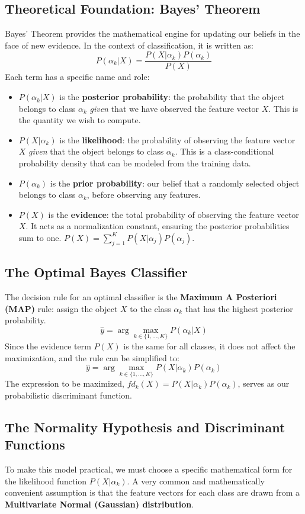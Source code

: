 \subsection*{Theoretical Foundation: Bayes' Theorem}
Bayes' Theorem provides the mathematical engine for updating our beliefs in the face of new evidence. In the context of classification, it is written as:
$$ P(\alpha_k | X) = \frac{P(X | \alpha_k) P(\alpha_k)}{P(X)} $$
Each term has a specific name and role:
\begin{itemize}
    \item \textbf{$P(\alpha_k | X)$} is the \textbf{posterior probability}: the probability that the object belongs to class $\alpha_k$ \textit{given} that we have observed the feature vector $X$. This is the quantity we wish to compute.
    \item \textbf{$P(X | \alpha_k)$} is the \textbf{likelihood}: the probability of observing the feature vector $X$ \textit{given} that the object belongs to class $\alpha_k$. This is a class-conditional probability density that can be modeled from the training data.
    \item \textbf{$P(\alpha_k)$} is the \textbf{prior probability}: our belief that a randomly selected object belongs to class $\alpha_k$, before observing any features.
    \item \textbf{$P(X)$} is the \textbf{evidence}: the total probability of observing the feature vector $X$. It acts as a normalization constant, ensuring the posterior probabilities sum to one. $P(X) = \sum_{j=1}^{K} P(X | \alpha_j) P(\alpha_j)$.
\end{itemize}

\subsection*{The Optimal Bayes Classifier}
The decision rule for an optimal classifier is the \textbf{Maximum A Posteriori (MAP)} rule: assign the object $X$ to the class $\alpha_k$ that has the highest posterior probability.
$$ \hat{y} = \arg\max_{k \in \{1, \dots, K\}} P(\alpha_k | X) $$
Since the evidence term $P(X)$ is the same for all classes, it does not affect the maximization, and the rule can be simplified to:
$$ \hat{y} = \arg\max_{k \in \{1, \dots, K\}} P(X | \alpha_k) P(\alpha_k) $$
The expression to be maximized, $fd_k(X) = P(X | \alpha_k) P(\alpha_k)$, serves as our probabilistic discriminant function.

\subsection*{The Normality Hypothesis and Discriminant Functions}
To make this model practical, we must choose a specific mathematical form for the likelihood function $P(X | \alpha_k)$. A very common and mathematically convenient assumption is that the feature vectors for each class are drawn from a \textbf{Multivariate Normal (Gaussian) distribution}.

